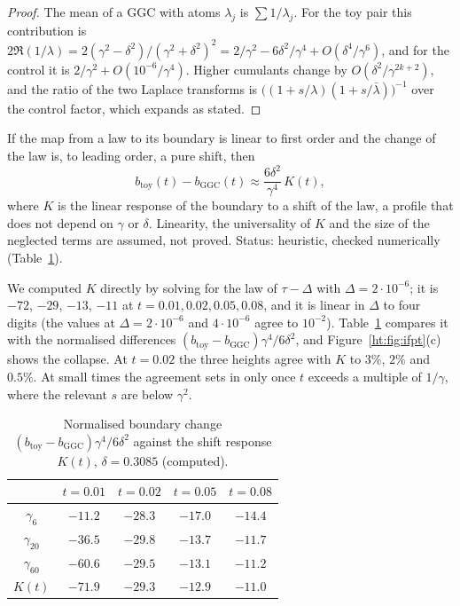 \begin{proof}
The mean of a GGC with atoms $\lambda_j$ is $\sum1/\lambda_j$. For the toy pair this contribution is $2\Re(1/\lambda)=2(\gamma^2-\delta^2)/(\gamma^2+\delta^2)^2=2/\gamma^2-6\delta^2/\gamma^4+O(\delta^4/\gamma^6)$, and for the control it is $2/\gamma^2+O(10^{-6}/\gamma^4)$. Higher cumulants change by $O(\delta^2/\gamma^{2k+2})$, and the ratio of the two Laplace transforms is $\big((1+s/\lambda)(1+s/\bar\lambda)\big)^{-1}$ over the control factor, which expands as stated.
\end{proof}

\begin{remark}\label{ht:rem:resp}
If the map from a law to its boundary is linear to first order and the change of the law is, to leading order, a pure shift, then
\[
b_{\mathrm{toy}}(t)-b_{\mathrm{GGC}}(t)\approx\frac{6\delta^2}{\gamma^4}\,K(t),
\]
where $K$ is the linear response of the boundary to a shift of the law, a profile that does not depend on $\gamma$ or $\delta$. Linearity, the universality of $K$ and the size of the neglected terms are assumed, not proved. Status: heuristic, checked numerically (Table~\ref{ht:tab:resp}).
\end{remark}

We computed $K$ directly by solving for the law of $\tau-\Delta$ with $\Delta=2\cdot10^{-6}$; it is $-72$, $-29$, $-13$, $-11$ at $t=0.01,0.02,0.05,0.08$, and it is linear in $\Delta$ to four digits (the values at $\Delta=2\cdot10^{-6}$ and $4\cdot10^{-6}$ agree to $10^{-2}$). Table~\ref{ht:tab:resp} compares it with the normalised differences $(b_{\mathrm{toy}}-b_{\mathrm{GGC}})\gamma^4/6\delta^2$, and Figure~\ref{ht:fig:ifpt}(c) shows the collapse. At $t=0.02$ the three heights agree with $K$ to $3\%$, $2\%$ and $0.5\%$. At small times the agreement sets in only once $t$ exceeds a multiple of $1/\gamma$, where the relevant $s$ are below $\gamma^2$.

\begin{table}[ht]
\centering\footnotesize
\begin{tabular}{ccccc}
\toprule
& $t=0.01$ & $t=0.02$ & $t=0.05$ & $t=0.08$ \\
\midrule
$\gamma_6$ & $-11.2$ & $-28.3$ & $-17.0$ & $-14.4$ \\
$\gamma_{20}$ & $-36.5$ & $-29.8$ & $-13.7$ & $-11.7$ \\
$\gamma_{60}$ & $-60.6$ & $-29.5$ & $-13.1$ & $-11.2$ \\
$K(t)$ & $-71.9$ & $-29.3$ & $-12.9$ & $-11.0$ \\
\bottomrule
\end{tabular}
\caption{Normalised boundary change $(b_{\mathrm{toy}}-b_{\mathrm{GGC}})\gamma^4/6\delta^2$ against the shift response $K(t)$, $\delta=0.3085$ (computed).}\label{ht:tab:resp}
\end{table}

